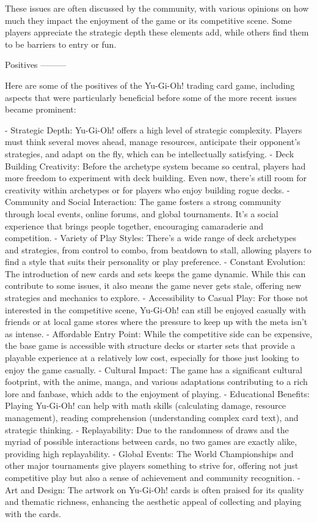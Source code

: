 These issues are often discussed by the community, with various opinions on how much they impact the enjoyment of the game or its competitive scene. Some players appreciate the strategic depth these elements add, while others find them to be barriers to entry or fun.


Positives
---------

Here are some of the positives of the Yu-Gi-Oh! trading card game, including aspects that were particularly beneficial before some of the more recent issues became prominent:

- Strategic Depth: Yu-Gi-Oh! offers a high level of strategic complexity. Players must think several moves ahead, manage resources, anticipate their opponent's strategies, and adapt on the fly, which can be intellectually satisfying.
- Deck Building Creativity: Before the archetype system became so central, players had more freedom to experiment with deck building. Even now, there's still room for creativity within archetypes or for players who enjoy building rogue decks.
- Community and Social Interaction: The game fosters a strong community through local events, online forums, and global tournaments. It's a social experience that brings people together, encouraging camaraderie and competition.
- Variety of Play Styles: There's a wide range of deck archetypes and strategies, from control to combo, from beatdown to stall, allowing players to find a style that suits their personality or play preference.
- Constant Evolution: The introduction of new cards and sets keeps the game dynamic. While this can contribute to some issues, it also means the game never gets stale, offering new strategies and mechanics to explore.
- Accessibility to Casual Play: For those not interested in the competitive scene, Yu-Gi-Oh! can still be enjoyed casually with friends or at local game stores where the pressure to keep up with the meta isn't as intense.
- Affordable Entry Point: While the competitive side can be expensive, the base game is accessible with structure decks or starter sets that provide a playable experience at a relatively low cost, especially for those just looking to enjoy the game casually.
- Cultural Impact: The game has a significant cultural footprint, with the anime, manga, and various adaptations contributing to a rich lore and fanbase, which adds to the enjoyment of playing.
- Educational Benefits: Playing Yu-Gi-Oh! can help with math skills (calculating damage, resource management), reading comprehension (understanding complex card text), and strategic thinking.
- Replayability: Due to the randomness of draws and the myriad of possible interactions between cards, no two games are exactly alike, providing high replayability.
- Global Events: The World Championships and other major tournaments give players something to strive for, offering not just competitive play but also a sense of achievement and community recognition.
- Art and Design: The artwork on Yu-Gi-Oh! cards is often praised for its quality and thematic richness, enhancing the aesthetic appeal of collecting and playing with the cards.

